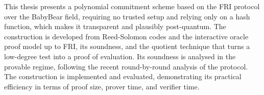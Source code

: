 \documentclass[12pt, a4paper, twoside]{report}
\theoremstyle{definition}
\theoremstyle{plain}
\theoremstyle{remark}
\begin{document}
\begin{center}
\begin{minipage}{0.8\textwidth}
This thesis presents a polynomial commitment scheme based on the FRI
protocol over the BabyBear field, requiring no trusted setup and relying
only on a hash function, which makes it transparent and plausibly
post-quantum. The construction is developed from Reed-Solomon codes and
the interactive oracle proof model up to FRI, its soundness, and the
quotient technique that turns a low-degree test into a proof of
evaluation. Its soundness is analysed in the provable regime, following
the recent round-by-round analysis of the protocol.
The construction is implemented and evaluated, demonstrating its practical
efficiency in terms of proof size, prover time, and verifier time.
\end{minipage}
\end{center}

\tableofcontents
\newpage









\printbibliography[title={Bibliography}]
\end{document}
